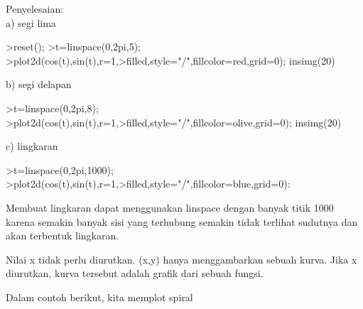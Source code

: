\documentclass{article}
\begin{document}
\begin{eulernotebook}
\begin{eulercomment}
\begin{eulercomment}
\begin{eulercomment}
\begin{eulercomment}
\begin{eulercomment}
\begin{eulercomment}
\begin{eulercomment}
\begin{eulercomment}
\begin{eulercomment}
Penyelesaian:\\
a) segi lima
\end{eulercomment}
\begin{eulerprompt}
>reset();
>t=linspace(0,2pi,5);
>plot2d(cos(t),sin(t),r=1,>filled,style="/",fillcolor=red,grid=0); insimg(20)
\end{eulerprompt}
\begin{eulercomment}
b) segi delapan
\end{eulercomment}
\begin{eulerprompt}
>t=linspace(0,2pi,8);
>plot2d(cos(t),sin(t),r=1,>filled,style="/",fillcolor=olive,grid=0); insimg(20)
\end{eulerprompt}
\begin{eulercomment}
c) lingkaran
\end{eulercomment}
\begin{eulerprompt}
>t=linspace(0,2pi,1000);
>plot2d(cos(t),sin(t),r=1,>filled,style="/",fillcolor=blue,grid=0):
\end{eulerprompt}
\begin{eulercomment}
Membuat lingkaran dapat menggunakan linspace dengan banyak titik 1000
karena semakin banyak sisi yang terhubung semakin tidak terlihat
sudutnya dan akan terbentuk lingkaran.
\end{eulercomment}
\begin{eulercomment}

\begin{eulercomment}
\begin{eulercomment}
Nilai x tidak perlu diurutkan. (x,y) hanya menggambarkan sebuah kurva.
Jika x diurutkan, kurva tersebut adalah grafik dari sebuah fungsi.

Dalam contoh berikut, kita memplot spiral


\end{eulercomment}
\end{eulercomment}
\end{eulercomment}
\end{eulercomment}
\end{eulercomment}
\end{eulercomment}
\end{eulercomment}
\end{eulercomment}
\end{eulercomment}
\end{eulercomment}
\end{eulercomment}
\end{eulernotebook}
\end{document}
